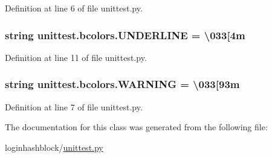 Definition at line 6 of file unittest.\+py.

\subsubsection[{\texorpdfstring{U\+N\+D\+E\+R\+L\+I\+NE}{UNDERLINE}}]{\setlength{\rightskip}{0pt plus 5cm}string unittest.\+bcolors.\+U\+N\+D\+E\+R\+L\+I\+NE = \textquotesingle{}\textbackslash{}033\mbox{[}4m\textquotesingle{}\hspace{0.3cm}{\ttfamily [static]}}\hypertarget{classunittest_1_1bcolors_ac181b1324b4847e254b738c74ef5fc00}{}\label{classunittest_1_1bcolors_ac181b1324b4847e254b738c74ef5fc00}


Definition at line 11 of file unittest.\+py.

\subsubsection[{\texorpdfstring{W\+A\+R\+N\+I\+NG}{WARNING}}]{\setlength{\rightskip}{0pt plus 5cm}string unittest.\+bcolors.\+W\+A\+R\+N\+I\+NG = \textquotesingle{}\textbackslash{}033\mbox{[}93m\textquotesingle{}\hspace{0.3cm}{\ttfamily [static]}}\hypertarget{classunittest_1_1bcolors_acc0c1f9b572e877f80e4017094d3de68}{}\label{classunittest_1_1bcolors_acc0c1f9b572e877f80e4017094d3de68}


Definition at line 7 of file unittest.\+py.



The documentation for this class was generated from the following file\+:\begin{DoxyCompactItemize}
\item 
loginhashblock/\hyperlink{unittest_8py}{unittest.\+py}\end{DoxyCompactItemize}
